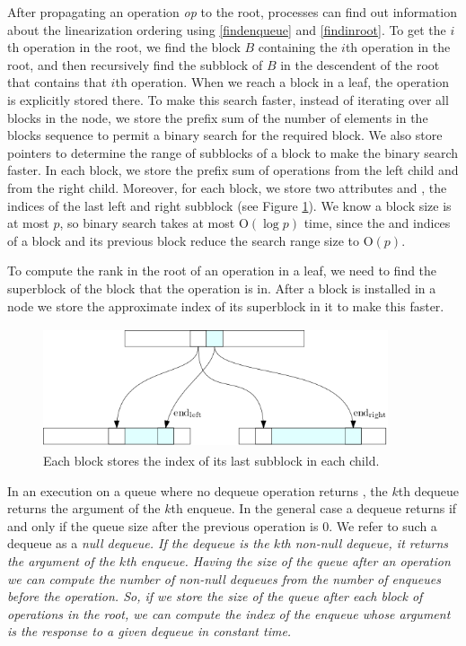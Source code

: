 After propagating an operation \textit{op} to the root, processes can
find out information about the linearization ordering using \ref{findenqueue} and
\ref{findinroot}.  
To get the $i$th operation in the root, we find the block $B$
containing the $i$th operation in the root, and then recursively find
the subblock of $B$ in the descendent of the root that contains that
$i$th operation. When we reach a block in a leaf, the operation is
explicitly stored there. To make this search faster, instead of
iterating over all blocks in the node, we store the prefix sum of the
number of elements in the blocks sequence to permit a binary search
for the required block. We also store pointers to determine the range
of subblocks of a block to make the binary search faster. In each
block, we store the prefix sum of operations from the left child and
from the right child. Moreover, for each block, we store two
attributes  and , the indices of
the last left and right subblock (see Figure \ref{fig::pointer}). We
know a block size is at most $p$, so binary search takes at most
\textsc{O}$(\log p)$ time, since the  and
 indices of a block and its previous block reduce
the search range size to \textsc{O}$(p)$. 

To compute the rank in the root of an operation in a leaf, we need to
find the superblock of the block that the operation is in. After a
block is installed in a node we store the approximate index of its
superblock in it to make this faster. 

\begin{figure}[hbtp]
\centering
  \includegraphics[width=4in, height=1.4in]{pics/pointers}
  \caption{Each block stores the index of its last subblock in each
    child. \label{fig::pointer}} 
\end{figure}

In an execution on a queue where no dequeue operation returns
, the $k$th dequeue returns the argument of the $k$th
enqueue. In the general case a dequeue returns  if and only
if the queue size after the previous operation is 0. We refer to such
a dequeue as a \it{null dequeue}. If the dequeue is the $k$th non-null
dequeue, it returns the argument of the $k$th enqueue. Having the size
of the queue after an operation we can compute the number of non-null
dequeues from the number of enqueues before the operation. So, if we
store the size of the queue after each block of operations in the
root, we can compute the index of the enqueue whose argument is the
response to a given dequeue in constant time. 

